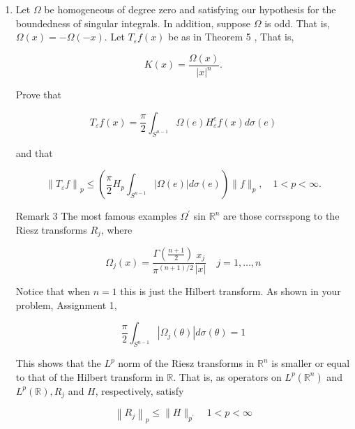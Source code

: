 \begin{enumerate}
\item 
Let $\Omega$ be homogeneous of degree zero and satisfying our hypothesis for the boundedness of singular integrals. In addition, suppose $\Omega$ is odd. That is, $\Omega(x)=-\Omega(-x)$. Let $T_{\varepsilon} f(x)$ be as in Theorem 5 , That is,

\[
K(x)=\frac{\Omega(x)}{|x|^n} .
\]


Prove that

\[
T_{\varepsilon} f(x)=\frac{\pi}{2} \int_{S^{n-1}} \Omega(e) H_{\varepsilon}^e f(x) d \sigma(e)
\]

and that

\[
\left\|T_{\varepsilon} f\right\|_p \leq\left(\frac{\pi}{2} H_p \int_{S^{n-1}}|\Omega(e)| d \sigma(e)\right)\|f\|_p, \quad 1<p<\infty .
\]


Remark 3 The most famous examples $\Omega^{\prime}$ sin $\mathbb{R}^n$ are those corrsspong to the Riesz transforms $R_j$, where

\[
\Omega_j(x)=\frac{\Gamma\left(\frac{n+1}{2}\right)}{\pi^{(n+1) / 2}} \frac{x_j}{|x|} \quad j=1, \ldots, n
\]


Notice that when $n=1$ this is just the Hilbert transform. As shown in your problem, Assignment 1,

\[
\frac{\pi}{2} \int_{S^{n-1}}\left|\Omega_j(\theta)\right| d \sigma(\theta)=1
\]


This shows that the $L^p$ norm of the Riesz transforms in $\mathbb{R}^n$ is smaller or equal to that of the Hilbert transform in $\mathbb{R}$. That is, as operators on $L^p\left(\mathbb{R}^n\right)$ and $L^p(\mathbb{R}), R_j$ and $H$, respectively, satisfy

\[
\left\|R_j\right\|_p \leq\|H\|_{p^{\prime}} \quad 1<p<\infty
\]



\end{enumerate}
